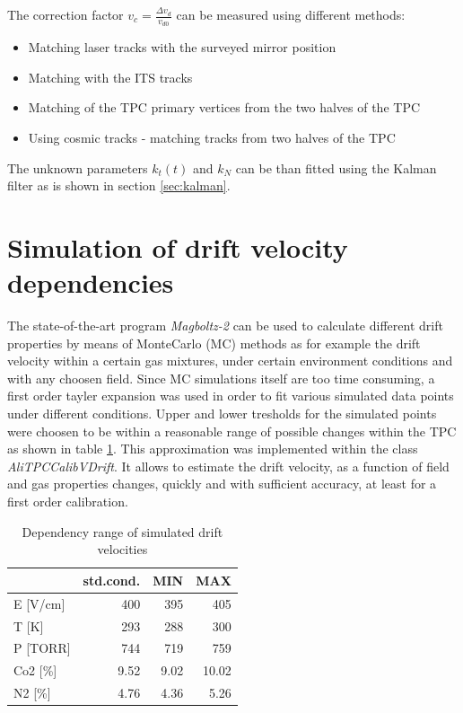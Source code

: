\documentclass{elsart}
\begin{document}
The correction factor $v_c=\frac{\Delta{v_d}}{v_{d0}}$ can be measured using different methods:
\begin{itemize}
\item Matching laser tracks with the surveyed mirror position
\item Matching with the ITS tracks
\item Matching of the TPC primary vertices from the two halves of the TPC
\item Using cosmic tracks - matching tracks from two halves of the TPC
\end{itemize}

The unknown parameters $k_t(t)$ and $k_N$ can be than fitted using the Kalman filter as is shown in section \ref{sec:kalman}.


\section{Simulation of drift velocity dependencies }
\label{sec:magbolzSim}

The state-of-the-art program \textsl{Magboltz-2} \cite{magboltz} can be used to calculate different drift properties by means of MonteCarlo (MC) methods as for example the drift velocity within a certain gas mixtures, under certain environment conditions and with any choosen field. Since MC simulations itself are too time consuming, a first order tayler expansion was used in order to fit various simulated data points under different conditions. Upper and lower tresholds for the simulated points were choosen to be within a reasonable range of possible changes within the TPC as shown in table \ref{tab:valRange}.  This approximation was implemented within the class \textsl{AliTPCCalibVDrift}. It allows to estimate the drift velocity, as a function of field and gas properties changes, quickly and with sufficient accuracy, at least for a first order calibration.\\

\begin{table}[htbp]
\caption{Dependency range of simulated drift velocities}
\centering
\begin{tabular}{|l|r|r|r|}
\hline
 & \multicolumn{1}{l|}{std.cond.} & \multicolumn{1}{l|}{MIN} & \multicolumn{1}{l|}{MAX}  \\ \hline
E [V/cm] & 400 & 395 & 405 \\ \hline
T [K]& 293 & 288 & 300  \\ \hline
P [TORR]& 744 & 719 & 759 \\ \hline
Co2 [\%]& 9.52 & 9.02 & 10.02  \\ \hline
N2 [\%]& 4.76 & 4.36 & 5.26  \\ \hline
\end{tabular}
\label{tab:valRange}
\end{table}
\end{document}
